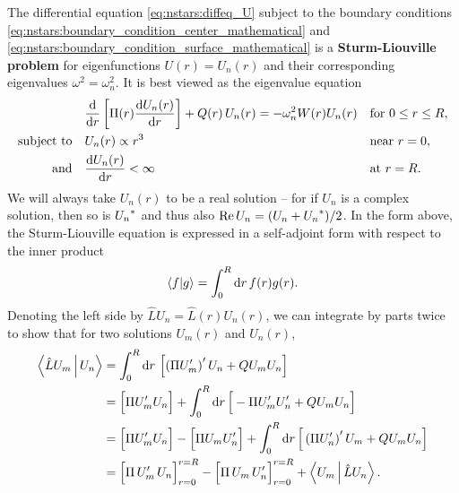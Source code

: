 The differential equation \eqref{eq:nstars:diffeq_U} subject to the boundary conditions \eqref{eq:nstars:boundary_condition_center_mathematical} and \eqref{eq:nstars:boundary_condition_surface_mathematical} is a \textbf{Sturm-Liouville problem} for eigenfunctions $U(r) = U_n(r)$ and their corresponding eigenvalues $\omega^2 = \omega_n^2$.
It is best viewed as the eigenvalue equation
\begin{subequations}
\begin{align}
	&\odv*{ \left[ \Pi(r) \odv{U_n(r)}{r} \right] }{r} + Q(r) \, U_n(r) = -\omega_n^2 W(r) U_n(r) && \text{for } 0 \leq r \leq R , \label{eq:nstars:sturm_liouville} \\
	\text{subject to} \quad & U_n(r)          \propto r^3    && \text{near } r=0 , \label{eq:nstars:sturm_liouville_boundary_condition1} \\
	\text{and}        \quad & \odv{U_n(r)}{r} <       \infty && \text{at } r=R . \label{eq:nstars:sturm_liouville_boundary_condition2}
\end{align}%
\label{eq:nstars:sturm_liouville_problem}%
\end{subequations}
We will always take $U_n(r)$ to be a real solution -- for if $U_n$ is a complex solution, then so is ${U_n}^*$ and thus also $\operatorname{Re}{U_n} = (U_n + {U_n}^*)/2$.
In the form above, the Sturm-Liouville equation is expressed in a self-adjoint form with respect to the inner product
\begin{equation}
	\braket{f | g} = \int_0^R \mathop{}\!\mathrm{d} r \, f(r) g(r) .
\label{eq:nstars:function_inner_product}
\end{equation}
Denoting the left side by $\hat{L} U_n = \hat{L}(r) U_n(r)$, we can integrate by parts twice to show that for two solutions $U_m(r)$ and $U_n(r)$,
\begin{equation}
\begin{split}
	\Braket{\hat{L} U_m | U_n} &= \int_0^R \mathop{}\!\mathrm{d} r \, \left[ \left( \Pi U_m' \right)' U_n + Q U_m U_n \right] \\
	                           &= \Big[ \Pi U_m' U_n \Big] + \int_0^R \mathop{}\!\mathrm{d} r \, \Big[ - \Pi U_m' U_n' + Q U_m U_n \Big] \\
	                           &= \Big[ \Pi U_m' U_n \Big] - \Big[ \Pi U_m U_n' \Big] + \int_0^R \mathop{}\!\mathrm{d} r \, \Big[ \left( \Pi U_n' \right)' U_m + Q U_m U_n \Big] \\
	                           &= \Big[ \Pi \, U_m' \, U_n \Big]_{r=0}^{r=R} - \Big[ \Pi \, U_m \, U_n' \Big]_{r=0}^{r=R} + \Braket{U_m | \hat{L} U_n} . \\
\end{split}
\end{equation}
